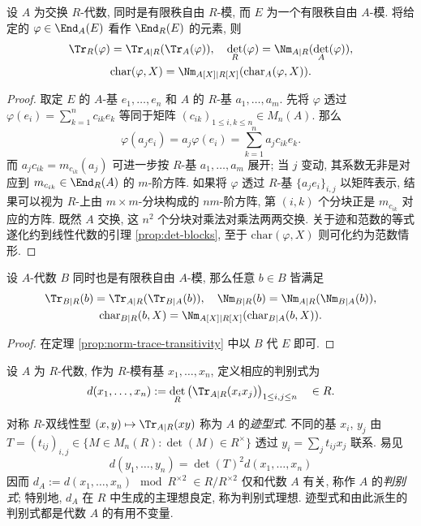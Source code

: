 \begin{theorem}\label{prop:norm-trace-transitivity}
	设 $A$ 为交换 $R$-代数, 同时是有限秩自由 $R$-模, 而 $E$ 为一个有限秩自由 $A$-模. 将给定的 $\varphi \in \End_A(E)$ 看作 $\End_R(E)$ 的元素, 则
	\begin{gather*}
		\Tr_R(\varphi) = \Tr_{A|R}(\Tr_A(\varphi)), \quad \det_R(\varphi) = \Nm_{A|R}(\det_A(\varphi)), \\
		\mathrm{char}(\varphi, X) = \Nm_{A[X]|R[X]}(\mathrm{char}_A(\varphi, X)).
	\end{gather*}
\end{theorem}
\begin{proof}
	取定 $E$ 的 $A$-基 $e_1, \ldots, e_n$ 和 $A$ 的 $R$-基 $a_1, \ldots,  a_m$. 先将 $\varphi$ 透过 $\varphi(e_i) = \sum_{k=1}^n c_{ik} e_k$ 等同于矩阵 $(c_{ik})_{1 \leq i,k \leq n} \in M_n(A)$. 那么
	\[ \varphi(a_j e_i) = a_j \varphi(e_i) = \sum_{k=1}^n a_j c_{ik} e_k. \]
	而 $a_j c_{ik} = m_{c_{ik}}(a_j)$ 可进一步按 $R$-基 $a_1, \ldots, a_m$ 展开; 当 $j$ 变动, 其系数无非是对应到 $m_{c_{ik}} \in \End_R(A)$ 的 $m$-阶方阵. 如果将 $\varphi$ 透过 $R$-基 $\{ a_j e_i \}_{i,j}$ 以矩阵表示, 结果可以视为 $R$-上由 $m \times m$-分块构成的 $nm$-阶方阵, 第 $(i,k)$ 个分块正是 $m_{c_{ik}}$ 对应的方阵. 既然 $A$ 交换, 这 $n^2$ 个分块对乘法对乘法两两交换. 关于迹和范数的等式遂化约到线性代数的引理 \ref{prop:det-blocks}, 至于 $\mathrm{char}(\varphi, X)$ 则可化约为范数情形.
\end{proof}

\begin{corollary}\label{prop:norm-trace-transitivity-2}
	设 $A$-代数 $B$ 同时也是有限秩自由 $A$-模, 那么任意 $b \in B$ 皆满足
	\begin{gather*}
		\Tr_{B|R}(b) = \Tr_{A|R}(\Tr_{B|A}(b)), \quad \Nm_{B|R}(b) = \Nm_{A|R}(\Nm_{B|A}(b)), \\
		\mathrm{char}_{B|R}(b,X) = \Nm_{A[X]|R[X]}(\mathrm{char}_{B|A}(b,X)).
	\end{gather*}
\end{corollary}
\begin{proof}
	在定理 \ref{prop:norm-trace-transitivity} 中以 $B$ 代 $E$ 即可.
\end{proof}

\begin{definition}\label{def:discriminant}
	设 $A$ 为 $R$-代数, 作为 $R$-模有基 $x_1, \ldots, x_n$, 定义相应的判别式为
	\[ d(x_1, \ldots, x_n) := \det_R \left( \Tr_{A|R}(x_i x_j) \right)_{1 \leq i,j \leq n} \quad \in R. \]
\end{definition}
对称 $R$-双线性型 $(x,y) \mapsto \Tr_{A|R}(xy)$ 称为 $A$ 的\emph{迹型式}. 不同的基 $x_i$, $y_j$ 由 $T = (t_{ij})_{i,j} \in \{M \in M_n(R): \det(M) \in R^\times \}$ 透过 $y_i = \sum_j t_{ij} x_j$ 联系. 易见 
\[ d(y_1, \ldots, y_n) = \det(T)^2 d(x_1, \ldots, x_n) \]
因而 $d_A := d(x_1, \ldots, x_n) \mod R^{\times 2}\; \in R/R^{\times 2}$ 仅和代数 $A$ 有关, 称作 $A$ 的\emph{判别式}; 特别地, $d_A$ 在 $R$ 中生成的主理想良定, 称为判别式理想. 迹型式和由此派生的判别式都是代数 $A$ 的有用不变量. 

